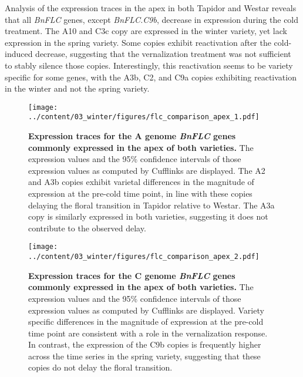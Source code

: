 \documentclass[12pt,]{book}
\begin{document}
Analysis of the expression traces in the apex in both Tapidor and Westar
reveals that all \emph{BnFLC} genes, except \emph{BnFLC.C9b}, decrease
in expression during the cold treatment. The A10 and C3c copy are
expressed in the winter variety, yet lack expression in the spring
variety. Some copies exhibit reactivation after the cold-induced
decrease, suggesting that the vernalization treatment was not sufficient
to stably silence those copies. Interestingly, this reactivation seems
to be variety specific for some genes, with the A3b, C2, and C9a copies
exhibiting reactivation in the winter and not the spring variety.

\begin{figure}[htbp]
\centering
\texttt{[image: ../content/03\_winter/figures/flc\_comparison\_apex\_1.pdf]}
\caption{\textbf{Expression traces for the A genome \emph{BnFLC} genes
commonly expressed in the apex of both varieties.} The expression values
and the 95\% confidence intervals of those expression values as computed
by Cufflinks are displayed. The A2 and A3b copies exhibit varietal
differences in the magnitude of expression at the pre-cold time point,
in line with these copies delaying the floral transition in Tapidor
relative to Westar. The A3a copy is similarly expressed in both
varieties, suggesting it does not contribute to the observed
delay.}\label{figure:3xx:flcapexagenome}
\end{figure}

\begin{figure}[htbp]
\centering
\texttt{[image: ../content/03\_winter/figures/flc\_comparison\_apex\_2.pdf]}
\caption{\textbf{Expression traces for the C genome \emph{BnFLC} genes
commonly expressed in the apex of both varieties.} The expression values
and the 95\% confidence intervals of those expression values as computed
by Cufflinks are displayed. Variety specific differences in the
magnitude of expression at the pre-cold time point are consistent with a
role in the vernalization response. In contrast, the expression of the
C9b copies is frequently higher across the time series in the spring
variety, suggesting that these copies do not delay the floral
transition.}\label{figure:3xx:flcapexcgenome}
\end{figure}
\end{document}
